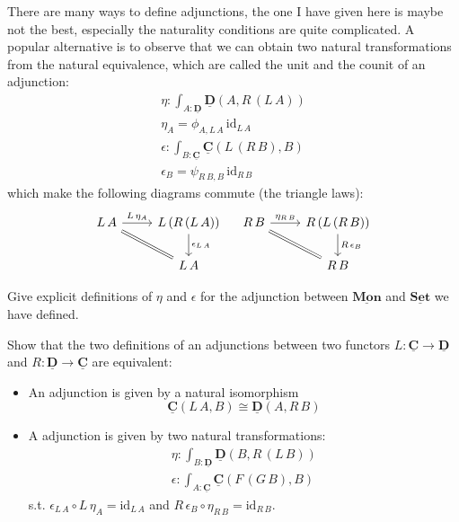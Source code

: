 \documentclass{article}
\newcommand{\Set}{\mathbf{Set}}
\newcommand{\cat}[1]{\underline{\mathbf{#1}}}
\newcommand{\id}{\mathrm{id}}
\begin{document}
There are many ways to define adjunctions, the one I have given here is maybe not the best, especially the naturality conditions are quite complicated. A popular alternative is to observe that we can obtain two natural transformations from the natural equivalence, which are called the unit and the counit of an adjunction:
\begin{align*}
  \eta : \int_{A:\cat{D}} \cat{D}(A,R\,(L\,A)) \\
  \eta_A = \phi_{A,L\,A}\,\id_{L\,A} \\
  \epsilon : \int_{B:\cat{C}} \cat{C}(L\,(R\,B),B) \\
  \epsilon_B = \psi_{R\,B,B}\,\id_{R\,B}
\end{align*}
which make the following diagrams commute (the triangle laws):
\[\begin{tikzcd}
L\,A \arrow[rd,equal] \arrow[r,"L\,\eta_{A}"] &   L\,(R\,(L\,A))\arrow[d,"\epsilon_{L\,A}"]\\
& L\,A
\end{tikzcd}
\quad
\begin{tikzcd}
R\,B \arrow[rd,equal] \arrow[r,"\eta_{R\,B}"] &   R\,(L\,(R\,B)) \arrow[d,"R\,\epsilon_B"]\\
& R\,B
\end{tikzcd}
\]

\begin{Exercise}
 Give explicit definitions of $\eta$ and $\epsilon$ for the adjunction between $\cat{Mon}$ and $\cat{\Set}$ we have defined.
\end{Exercise}

\begin{Exercise}
  Show that the two definitions of an adjunctions between two functors $L : \cat{C} \to \cat{D}$ and $R : \cat{D} \to \cat{C}$ are equivalent: 
  \begin{itemize}
  \item An adjunction is given by a natural isomorphism 
    \[ \cat{C}(L\,A,B)  \cong \cat{D}(A,R\,B)  \]
  \item A adjunction is given by two natural transformations: 
    \begin{align*}
      \eta : \int_{B:\cat{D}} \cat{D}(B,R\,(L\,B))\\
      \epsilon : \int_{A:\cat{C}} \cat{C}(F\,(G\,B),B) 
    \end{align*}
    s.t. $\epsilon_{L\,A} \circ L\,\eta_A = \id_{L\,A}$ and $R\,\epsilon_B \circ \eta_{R\,B} = \id_{R\,B}$.
  \end{itemize}
\end{Exercise}
\end{document}
